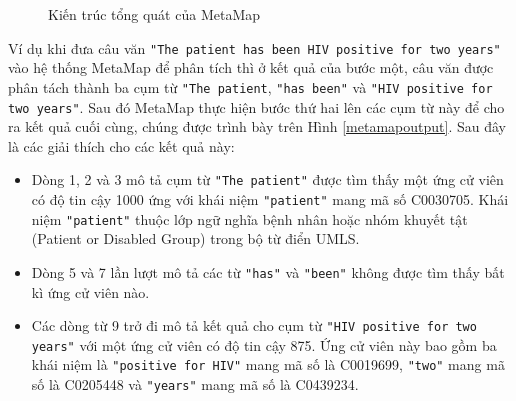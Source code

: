 \begin{figure}[t]
\centering
{}
\caption{Kiến trúc tổng quát của MetaMap\label{metamapstructure}}
\end{figure}

Ví dụ khi đưa câu văn \texttt{"The patient has been HIV positive for two years"} vào hệ thống MetaMap để phân tích thì ở kết quả của bước một, câu văn được phân tách thành ba cụm từ \texttt{"The patient}, \texttt{"has been"} và \texttt{"HIV positive for two years"}. Sau đó MetaMap thực hiện bước thứ hai lên các cụm từ này để cho ra kết quả cuối cùng, chúng được trình bày trên Hình \ref{metamapoutput}. Sau đây là các giải thích cho các kết quả này:

\begin{itemize}
\item Dòng 1, 2 và 3 mô tả cụm từ \texttt{"The patient"} được tìm thấy một ứng cử viên có độ tin cậy 1000 ứng với khái niệm \texttt{"patient"} mang mã số C0030705. Khái niệm \texttt{"patient"} thuộc lớp ngữ nghĩa bệnh nhân hoặc nhóm khuyết tật (Patient or Disabled Group) trong bộ từ điển UMLS.
\item Dòng 5 và 7 lần lượt mô tả các từ \texttt{"has"} và \texttt{"been"} không được tìm thấy bất kì ứng cử viên nào.
\item Các dòng từ 9 trở đi mô tả kết quả cho cụm từ \texttt{"HIV positive for two years"} với một ứng cử viên có độ tin cậy 875. Ứng cử viên này bao gồm ba khái niệm là \texttt{"positive for HIV"} mang mã số là C0019699, \texttt{"two"} mang mã số là C0205448 và \texttt{"years"} mang mã số là C0439234. 
\end{itemize}

